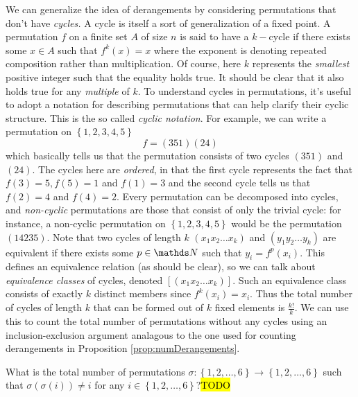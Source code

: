 We can generalize the idea of derangements by considering permutations
that don't have \emph{cycles. }A cycle is itself a sort of generalization
of a fixed point. A permutation $f$ on a finite set $A$ of size
$n$ is said to have a $k-$cycle if there exists some $x\in A$ such
that $f^{k}\left(x\right)=x$ where the exponent is denoting repeated
composition rather than multiplication. Of course, here $k$ represents
the \emph{smallest }positive integer such that the equality holds
true. It should be clear that it also holds true for any \emph{multiple
}of $k$. To understand cycles in permutations, it's useful to adopt
a notation for describing permutations that can help clarify their
cyclic structure. This is the so called \emph{cyclic notation}. For
example, we can write a permutation on $\left\{ 1,2,3,4,5\right\} $
\[
f=\left(351\right)\left(24\right)
\]
which basically tells us that the permutation consists of two cycles
$\left(351\right)$ and $\left(24\right)$. The cycles here are \emph{ordered},
in that the first cycle represents the fact that $f\left(3\right)=5,f\left(5\right)=1$
and $f\left(1\right)=3$ and the second cycle tells us that $f\left(2\right)=4$
and $f\left(4\right)=2$. Every permutation can be decomposed into
cycles, and \emph{non-cyclic }permutations are those that consist
of only the trivial cycle: for instance, a non-cyclic permutation
on $\left\{ 1,2,3,4,5\right\} $ would be the permutation $\left(14235\right).$
Note that two cycles of length $k$ $\left(x_{1}x_{2}\ldots x_{k}\right)$
and $\left(y_{1}y_{2}\ldots y_{k}\right)$ are equivalent if there
exists some $p\in\N$ such that $y_{i}=f^{p}\left(x_{i}\right)$.
This defines an equivalence relation (as should be clear), so we can
talk about \emph{equivalence classes} of cycles, denoted $\left[\left(x_{1}x_{2}\ldots x_{k}\right)\right]$.
Such an equivalence class consists of exactly $k$ distinct members
since $f^{k}\left(x_{i}\right)=x_{i}.$ Thus the total number of cycles
of length $k$ that can be formed out of $k$ fixed elements is $\frac{k!}{k}$.
We can use this to count the total number of permutations without
any cycles using an inclusion-exclusion argument analagous to the
one used for counting derangements in Proposition \ref{prop:numDerangements}.
\begin{example}
\label{exa:isi2021psa14}What is the total number of permutations
$\sigma:\left\{ 1,2,\ldots,6\right\} \to\left\{ 1,2,\ldots,6\right\} $
such that $\sigma\left(\sigma\left(i\right)\right)\neq i$ for any
$i\in\left\{ 1,2,\ldots,6\right\} $?\hl{TODO}
\end{example}


